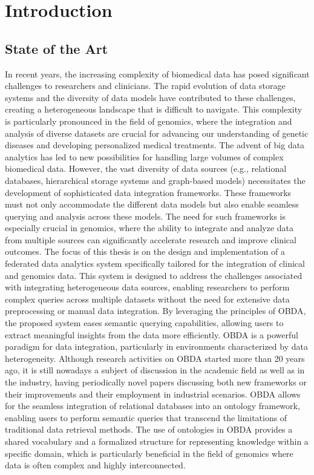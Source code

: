 
\chapter{Introduction}
\label{chp:intro}

\section{State of the Art}
In recent years, the increasing complexity of biomedical data has posed significant challenges to researchers and clinicians. The rapid evolution of data storage systems and the diversity of data models have contributed to these challenges, creating a heterogeneous landscape that is difficult to navigate. This complexity is particularly pronounced in the field of genomics, where the integration and analysis of diverse datasets are crucial for advancing our understanding of genetic diseases and developing personalized medical treatments.
The advent of big data analytics has led to new possibilities for handling large volumes of complex biomedical data. However, the vast diversity of data sources (e.g., relational databases, hierarchical storage systems and graph-based models) necessitates the development of sophisticated data integration frameworks. These frameworks must not only accommodate the different data models but also enable seamless querying and analysis across these models. The need for such frameworks is especially crucial in genomics, where the ability to integrate and analyze data from multiple sources can significantly accelerate research and improve clinical outcomes.
The focus of this thesis is on the design and implementation of a federated data analytics system specifically tailored for the integration of clinical and genomics data. This system is designed to address the challenges associated with integrating heterogeneous data sources, enabling researchers to perform complex queries across multiple datasets without the need for extensive data preprocessing or manual data integration. By leveraging the principles of \ac{OBDA}, the proposed system eases semantic querying capabilities, allowing users to extract meaningful insights from the data more efficiently.
\ac{OBDA} is a powerful paradigm for data integration, particularly in environments characterized by data heterogeneity. Although research activities on \ac{OBDA} started more than 20 years ago, it is still nowadays a subject of discussion in the academic field as well as in the industry, having periodically novel papers discussing both new frameworks or their improvements and their employment in industrial scenarios. \ac{OBDA} allows for the seamless integration of relational databases into an ontology framework, enabling users to perform semantic queries that transcend the limitations of traditional data retrieval methods. The use of ontologies in \ac{OBDA} provides a shared vocabulary and a formalized structure for representing knowledge within a specific domain, which is particularly beneficial in the field of genomics where data is often complex and highly interconnected.
